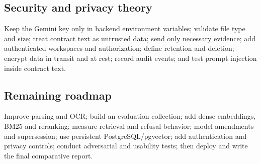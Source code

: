 \documentclass[11pt,letterpaper]{article}
\begin{document}
\subsection{Security and privacy theory}
Keep the Gemini key only in backend environment variables; validate file type and size; treat contract text as untrusted data; send only necessary evidence; add authenticated workspaces and authorization; define retention and deletion; encrypt data in transit and at rest; record audit events; and test prompt injection inside contract text.

\subsection{Remaining roadmap}
Improve parsing and OCR; build an evaluation collection; add dense embeddings, BM25 and reranking; measure retrieval and refusal behavior; model amendments and supersession; use persistent PostgreSQL/pgvector; add authentication and privacy controls; conduct adversarial and usability tests; then deploy and write the final comparative report.

\newpage
\end{document}
